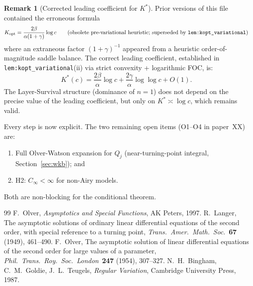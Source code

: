 \documentclass[12pt,a4paper]{amsart}
\theoremstyle{definition}
\newtheorem{remark}[theorem]{Remark}
\begin{document}
\begin{remark}[Corrected leading coefficient for $K^*$]
\label{rem:kopt_fix}
Prior versions of this file contained the erroneous formula
\[
  K_{\mathrm{opt}} = \frac{2\beta}{\alpha(1+\gamma)}\log c
  \qquad\text{(obsolete pre-variational heuristic; superseded by
  \texttt{lem:kopt\_variational})}
\]
where an extraneous factor $(1+\gamma)^{-1}$ appeared from
a heuristic order-of-magnitude saddle balance.
The correct leading coefficient,
established in \texttt{lem:kopt\_variational}(ii) via
strict convexity + logarithmic FOC, is:
\[
  K^*(c) = \frac{2\beta}{\alpha}\log c + \frac{2\gamma}{\alpha}\log\log c + O(1).
\]
The Layer-Survival structure (dominance of $n=1$) does not depend
on the precise value of the leading coefficient,
but only on $K^*\asymp\log c$, which remains valid.
\end{remark}

Every step is now explicit.
The two remaining open items (O1--O4 in paper~XX) are:
\begin{enumerate}[label=(\roman*),nosep]
  \item Full Olver-Watson expansion for $Q_j$
    (near-turning-point integral, Section~\ref{sec:wkb}); and
  \item H2: $C_\infty < \infty$ for non-Airy models.
\end{enumerate}
Both are non-blocking for the conditional theorem.

\begin{thebibliography}{99}
 F.~Olver,
  \textit{Asymptotics and Special Functions}, AK Peters, 1997.
 R.~Langer,
  The asymptotic solutions of ordinary linear differential equations
  of the second order, with special reference to a turning point,
  \textit{Trans.\ Amer.\ Math.\ Soc.}\ \textbf{67} (1949), 461--490.
 F.~Olver,
  The asymptotic solution of linear differential equations of the
  second order for large values of a parameter,
  \textit{Phil.\ Trans.\ Roy.\ Soc.\ London}\ \textbf{247} (1954),
  307--327.
 N.~H.\ Bingham, C.~M.\ Goldie, J.~L.\ Teugels,
  \textit{Regular Variation},
  Cambridge University Press, 1987.
\end{thebibliography}
\end{document}
